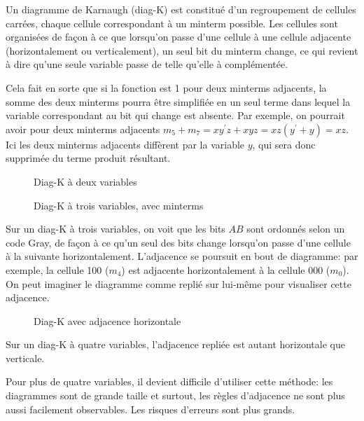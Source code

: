 \documentclass[11pt]{article}
\begin{document}
Un diagramme de Karnaugh (diag-K) est constitué d'un regroupement de
cellules carrées, chaque cellule correspondant à un minterm
possible. Les cellules sont organisées de façon à ce que lorsqu'on
passe d'une cellule à une cellule adjacente (horizontalement ou
verticalement), un seul bit du minterm change, ce qui revient à dire
qu'une seule variable passe de telle qu'elle à complémentée.

Cela fait en sorte que si la fonction est 1 pour deux minterms
adjacents, la somme des deux minterms pourra être simplifiée en un
seul terme dans lequel la variable correspondant au bit qui change est
absente. Par exemple, on pourrait avoir pour deux minterms adjacents
\(m_5 + m_7 = xy^\prime z + xyz = xz(y^\prime + y) = xz\). Ici les
deux minterms adjacents diffèrent par la variable \(y\), qui sera donc
supprimée du terme produit résultant.

\begin{figure}[htbp]
\centering

\caption{\label{fig:orgc54d1ba}Diag-K à deux variables}
\end{figure}

\begin{figure}[htbp]
\centering

\caption{\label{fig:org2747739}Diag-K à trois variables, avec minterms}
\end{figure}

Sur un diag-K à trois variables, on voit que les bits \(AB\) sont
ordonnés selon un code Gray, de façon à ce qu'un seul des bits change
lorsqu'on passe d'une cellule à la suivante
horizontalement. L'adjacence se poursuit en bout de diagramme: par
exemple, la cellule 100 (\(m_4\)) est adjacente horizontalement à la
cellule 000 (\(m_0\)). On peut imaginer le diagramme comme replié sur
lui-même pour visualiser cette adjacence.

\begin{figure}[htbp]
\centering

\caption{\label{fig:orgb11137f}Diag-K avec adjacence horizontale}
\end{figure}

Sur un diag-K à quatre variables, l'adjacence repliée est autant horizontale
que verticale.

Pour plus de quatre variables, il devient difficile d'utiliser cette
méthode: les diagrammes sont de grande taille et surtout, les règles
d'adjacence ne sont plus aussi facilement observables. Les risques
d'erreurs sont plus grands.
\end{document}

